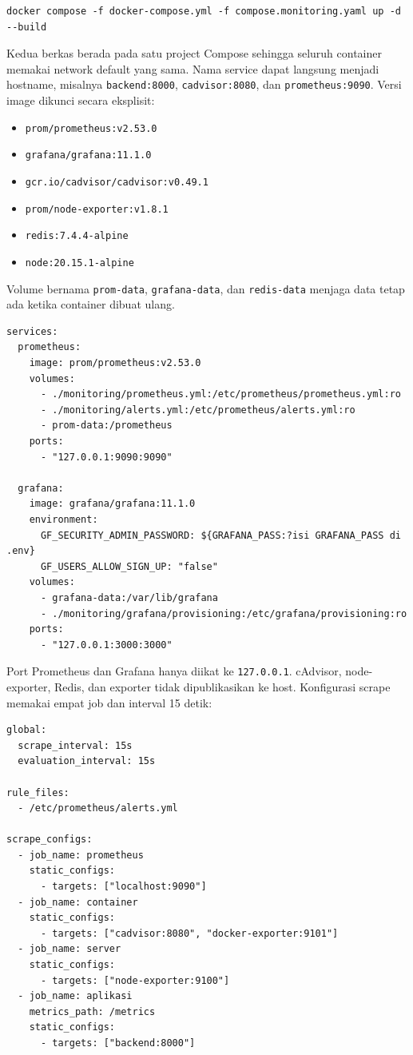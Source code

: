 \documentclass[a4paper,oneside,11pt]{book}
\begin{document}
\begin{lstlisting}[language={},style=htmlstyle]
docker compose -f docker-compose.yml -f compose.monitoring.yaml up -d --build
\end{lstlisting}

Kedua berkas berada pada satu project Compose sehingga seluruh container memakai network default yang sama. Nama service dapat langsung menjadi hostname, misalnya \texttt{backend:8000}, \texttt{cadvisor:8080}, dan \texttt{prometheus:9090}. Versi image dikunci secara eksplisit:
\begin{itemize}[leftmargin=*]
    \item \texttt{prom/prometheus:v2.53.0}
    \item \texttt{grafana/grafana:11.1.0}
    \item \texttt{gcr.io/cadvisor/cadvisor:v0.49.1}
    \item \texttt{prom/node-exporter:v1.8.1}
    \item \texttt{redis:7.4.4-alpine}
    \item \texttt{node:20.15.1-alpine}
\end{itemize}
Volume bernama \texttt{prom-data}, \texttt{grafana-data}, dan \texttt{redis-data} menjaga data tetap ada ketika container dibuat ulang.

\begin{lstlisting}[language={},style=htmlstyle]
services:
  prometheus:
    image: prom/prometheus:v2.53.0
    volumes:
      - ./monitoring/prometheus.yml:/etc/prometheus/prometheus.yml:ro
      - ./monitoring/alerts.yml:/etc/prometheus/alerts.yml:ro
      - prom-data:/prometheus
    ports:
      - "127.0.0.1:9090:9090"

  grafana:
    image: grafana/grafana:11.1.0
    environment:
      GF_SECURITY_ADMIN_PASSWORD: ${GRAFANA_PASS:?isi GRAFANA_PASS di .env}
      GF_USERS_ALLOW_SIGN_UP: "false"
    volumes:
      - grafana-data:/var/lib/grafana
      - ./monitoring/grafana/provisioning:/etc/grafana/provisioning:ro
    ports:
      - "127.0.0.1:3000:3000"
\end{lstlisting}

Port Prometheus dan Grafana hanya diikat ke \texttt{127.0.0.1}. cAdvisor, node-exporter, Redis, dan exporter tidak dipublikasikan ke host. Konfigurasi scrape memakai empat job dan interval 15 detik:

\begin{lstlisting}[language={},style=htmlstyle]
global:
  scrape_interval: 15s
  evaluation_interval: 15s

rule_files:
  - /etc/prometheus/alerts.yml

scrape_configs:
  - job_name: prometheus
    static_configs:
      - targets: ["localhost:9090"]
  - job_name: container
    static_configs:
      - targets: ["cadvisor:8080", "docker-exporter:9101"]
  - job_name: server
    static_configs:
      - targets: ["node-exporter:9100"]
  - job_name: aplikasi
    metrics_path: /metrics
    static_configs:
      - targets: ["backend:8000"]
\end{lstlisting}
\end{document}
